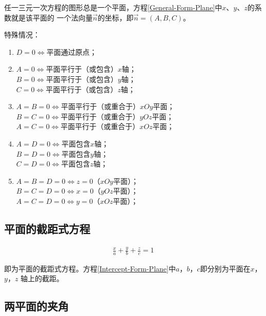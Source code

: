 \documentclass[
	11pt, %
	a4paper, %
]{WhuSakuraBook}
\begin{document}
    任一三元一次方程的图形总是一个平面，方程\ref{General-Form-Plane}中\(x\)、\(y\)、\(z\)的系数就是该平面的
    一个法向量\(\overrightarrow{n}\)的坐标，即\(\overrightarrow{n} = \left(A, B, C\right)\)。

    特殊情况：

    \begin{enumerate}
        \item \(D=0 \Leftrightarrow \)平面通过原点；
        \item \(A=0 \Leftrightarrow \)平面平行于（或包含）\(x\)轴；
            \\
            \(B=0 \Leftrightarrow \)平面平行于（或包含）\(y\)轴；
            \\
            \(C=0 \Leftrightarrow \)平面平行于（或包含）\(z\)轴；
        \item \(A=B=0 \Leftrightarrow \)平面平行于（或重合于）\(xOy\)平面；
            \\
            \(B=C=0 \Leftrightarrow \)平面平行于（或重合于）\(yOz\)平面；
            \\
            \(A=C=0 \Leftrightarrow \)平面平行于（或重合于）\(xOz\)平面；
        \item \(A=D=0 \Leftrightarrow \)平面包含\(x\)轴；
            \\
            \(B=D=0 \Leftrightarrow \)平面包含\(y\)轴；
            \\
            \(C=D=0 \Leftrightarrow \)平面包含\(z\)轴；
        \item \(A=B=D=0 \Leftrightarrow z=0\)（\(xOy\)平面）；
            \\
            \(B=C=D=0 \Leftrightarrow x=0\)（\(yOz\)平面）；
            \\
            \(A=C=D=0 \Leftrightarrow y=0\)（\(xOz\)平面）；
    \end{enumerate}

\subsection{平面的截距式方程}

    \begin{align}
        \frac{x}{a} + \frac{y}{b} + \frac{z}{c} = 1
        \label{Intercept-Form-Plane}
    \end{align}

    即为平面的截距式方程。方程\ref{Intercept-Form-Plane}中\(a\)，\(b\)，\(c\)即分别为平面在\(x\)，\(y\)，\(z\)
    轴上的截距。

\subsection{两平面的夹角}
\end{document}
